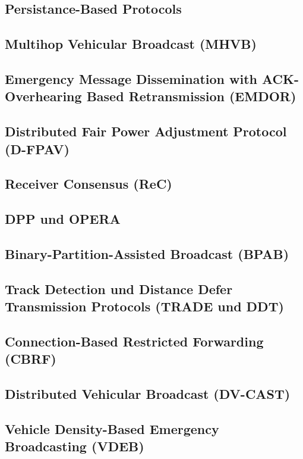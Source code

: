 \documentclass[english,runningheads,a4paper]{llncs}[2018/03/10]
\begin{document}
\subsection{Persistance-Based Protocols}

\subsection{Multihop Vehicular Broadcast (MHVB)}

\subsection{Emergency Message Dissemination with ACK-Overhearing Based Retransmission (EMDOR)}

\subsection{Distributed Fair Power Adjustment Protocol (D-FPAV)}

\subsection{Receiver Consensus (ReC)}

\subsection{DPP und OPERA}

\subsection{Binary-Partition-Assisted Broadcast (BPAB)}

\subsection{Track Detection und Distance Defer Transmission Protocols (TRADE und DDT)}

\subsection{Connection-Based Restricted Forwarding (CBRF)}

\subsection{Distributed Vehicular Broadcast (DV-CAST)}

\subsection{Vehicle Density-Based Emergency Broadcasting (VDEB)}
\end{document}
